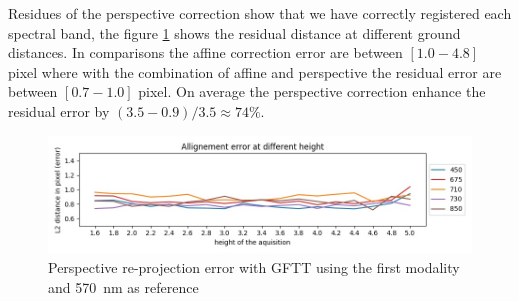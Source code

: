 \documentclass[]{elsarticle}
\begin{document}
	\par Residues of the perspective correction show that we have correctly registered each spectral band,
	the figure \ref{fig:perspective-error} shows the residual distance at different ground distances.
	In comparisons the affine correction error are between $[1.0-4.8]$ pixel where with the combination
	of affine and perspective the residual error are between $[0.7-1.0]$ pixel.
	On average the perspective correction enhance the residual error by $(3.5-0.9)/3.5 \approx 74\si{\percent}$.
	
	\begin{figure}[H]
		\centering
		\includegraphics[width=0.8\linewidth]{../figures/prespective-allignement-rmse.jpg}
		\caption{Perspective re-projection error with GFTT using the first modality and \SI{570}{\nano\meter} as reference}
		\label{fig:perspective-error}
	\end{figure}
	
\end{document}
